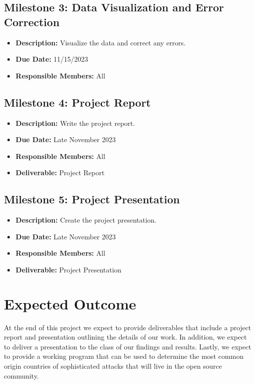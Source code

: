 \documentclass[letterpaper, 10 pt, conference]{ieeeconf}  %
\begin{document}
    \subsection*{Milestone 3: Data Visualization and Error Correction}
    \begin{itemize}
        \item \textbf{Description:} Visualize the data and correct any errors.
        \item \textbf{Due Date:} 11/15/2023
        \item \textbf{Responsible Members:} All
    \end{itemize}
    \subsection*{Milestone 4: Project Report}
    \begin{itemize}
        \item \textbf{Description:} Write the project report.
        \item \textbf{Due Date:} Late November 2023
        \item \textbf{Responsible Members:} All
        \item \textbf{Deliverable:} Project Report
    \end{itemize}
    \subsection*{Milestone 5: Project Presentation}
    \begin{itemize}
        \item \textbf{Description:} Create the project presentation.
        \item \textbf{Due Date:} Late November 2023
        \item \textbf{Responsible Members:} All
        \item \textbf{Deliverable:} Project Presentation
    \end{itemize}


\section{Expected Outcome}

At the end of this project we expect to provide deliverables that include a project report and presentation outlining the details of our work. 
In addition, we expect to deliver a presentation to the class of our findings and results. 
Lastly, we expect to provide a working program that can be used to determine the most common origin countries of sophisticated attacks that will live in the open source community. 
\end{document}
